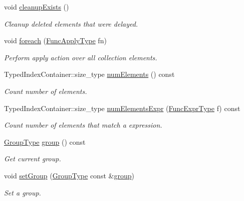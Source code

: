 \begin{DoxyCompactItemize}
void \hyperlink{structvt_1_1vrt_1_1collection_1_1_holder_a46a48d80d10924fbb928f4267a83c441}{cleanup\+Exists} ()
\begin{DoxyCompactList}\small\item\em Cleanup deleted elements that were delayed. \end{DoxyCompactList}\item 
void \hyperlink{structvt_1_1vrt_1_1collection_1_1_holder_adbdb11d1c83ec0c4ce3d02df283a4a35}{foreach} (\hyperlink{structvt_1_1vrt_1_1collection_1_1_holder_ad90339cb0c4fe0d69f4e0100265a15d4}{Func\+Apply\+Type} fn)
\begin{DoxyCompactList}\small\item\em Perform apply action over all collection elements. \end{DoxyCompactList}\item 
Typed\+Index\+Container\+::size\+\_\+type \hyperlink{structvt_1_1vrt_1_1collection_1_1_holder_a430a021e0113ddfeb18a1bb2e72522ba}{num\+Elements} () const
\begin{DoxyCompactList}\small\item\em Count number of elements. \end{DoxyCompactList}\item 
Typed\+Index\+Container\+::size\+\_\+type \hyperlink{structvt_1_1vrt_1_1collection_1_1_holder_ae75fb5f11a3383a8e758d9a6d24fd536}{num\+Elements\+Expr} (\hyperlink{structvt_1_1vrt_1_1collection_1_1_holder_a4d4364a2f3aa30c8a86cb08742a84e25}{Func\+Expr\+Type} f) const
\begin{DoxyCompactList}\small\item\em Count number of elements that match a expression. \end{DoxyCompactList}\item 
\hyperlink{namespacevt_a27b5e4411c9b6140c49100e050e2f743}{Group\+Type} \hyperlink{structvt_1_1vrt_1_1collection_1_1_holder_a0bcb968630cce9e2da7a68dbbd46d746}{group} () const
\begin{DoxyCompactList}\small\item\em Get current group. \end{DoxyCompactList}\item 
void \hyperlink{structvt_1_1vrt_1_1collection_1_1_holder_a69156fa0708db3d9d017c0693653cef4}{set\+Group} (\hyperlink{namespacevt_a27b5e4411c9b6140c49100e050e2f743}{Group\+Type} const \&\hyperlink{structvt_1_1vrt_1_1collection_1_1_holder_a0bcb968630cce9e2da7a68dbbd46d746}{group})
\begin{DoxyCompactList}\small\item\em Set a group. \end{DoxyCompactList}\item 

\end{DoxyCompactItemize}
